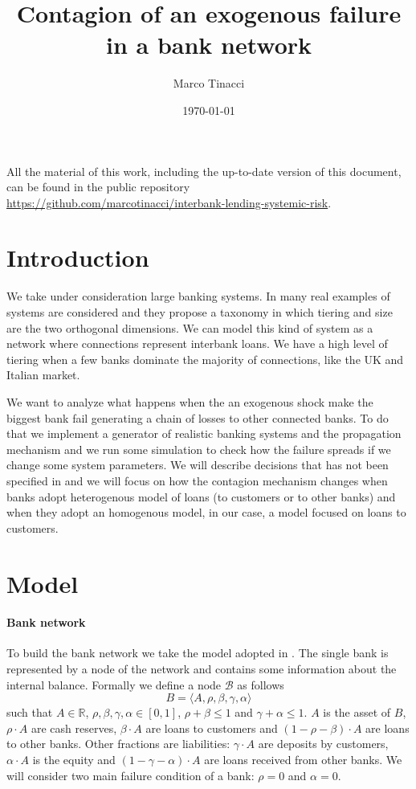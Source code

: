 \documentclass[a4paper, 11pt]{article}
\begin{document}
\title{Contagion of an exogenous failure in a bank network}
\date{\today}
\author{Marco Tinacci}
\maketitle

All the material of this work, including the up-to-date version of this document, can be found in the public repository \url{https://github.com/marcotinacci/interbank-lending-systemic-risk}.

\section{Introduction} %
\label{sec:introduction}
We take under consideration large banking systems. In \cite{KrauseGiansante} many real examples of systems are considered and they propose a taxonomy in which tiering and size are the two orthogonal dimensions. We can model this kind of system as a network where connections represent interbank loans. We have a high level of tiering when a few banks dominate the majority of connections, like the UK and Italian market.

We want to analyze what happens when the an exogenous shock make the biggest bank fail generating a chain of losses to other connected banks. To do that we implement a generator of realistic banking systems and the propagation mechanism and we run some simulation to check how the failure spreads if we change some system parameters. We will describe decisions that has not been specified in \cite{KrauseGiansante} and we will focus on how the contagion mechanism changes when banks adopt heterogenous model of loans (to customers or to other banks) and when they adopt an homogenous model, in our case, a model focused on loans to customers.


\section{Model} %
\label{sec:model}

\paragraph{Bank network} %
To build the bank network we take the model adopted in \cite{KrauseGiansante}. The single bank is represented by a node of the network and contains some information about the internal balance. Formally we define a node $\mathcal{B}$ as follows
$$ B = \langle A,\rho,\beta,\gamma,\alpha \rangle $$
such that $A \in \mathbb{R}$, $\rho,\beta,\gamma,\alpha \in [0,1]$, $\rho + \beta \leq 1$ and $\gamma + \alpha \leq 1$. $A$ is the asset of $B$, $\rho \cdot A$ are cash reserves, $\beta \cdot A$ are loans to customers and $(1-\rho-\beta) \cdot A$ are loans to other banks. Other fractions are liabilities: $\gamma \cdot A$ are deposits by customers, $\alpha \cdot A$ is the equity and $(1-\gamma-\alpha) \cdot A$ are loans received from other banks. We will consider two main failure condition of a bank: $\rho = 0$ and $\alpha = 0$.
\end{document}
